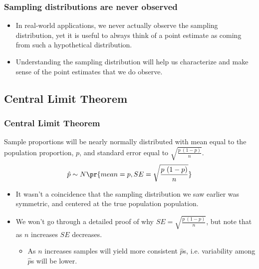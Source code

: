 
\begin{frame}
\frametitle{Sampling distributions are never observed}

\begin{itemize}

\item In real-world applications, we never actually observe the sampling distribution, yet it is useful to always think of a point estimate as coming from such a hypothetical distribution.

\item Understanding the sampling distribution will help us characterize and make sense of the point estimates that we do observe.

\end{itemize}

\end{frame}


\subsection{Central Limit Theorem}


\begin{frame}
\frametitle{Central Limit Theorem}

{Sample proportions will be nearly normally distributed with mean equal to the population proportion, $p$, and standard error equal to $\sqrt{\frac{p~(1-p)}{n}}$.
\[ \hat{p} \sim N \pr{ mean = p, SE = \sqrt{\frac{p~(1-p)}{n}} } \]
}

\begin{itemize}

\item It wasn't a coincidence that the sampling distribution we saw earlier was symmetric, and centered at the true population population.

\item We won't go through a detailed proof of why $SE =  \sqrt{\frac{p~(1-p)}{n}}$, but note that as $n$ increases $SE$ decreases.
\begin{itemize}
\item As $n$ increases samples will yield more consistent $\hat{p}$s, i.e. variability among $\hat{p}$s will be lower.
\end{itemize}

\end{itemize}

\end{frame}

